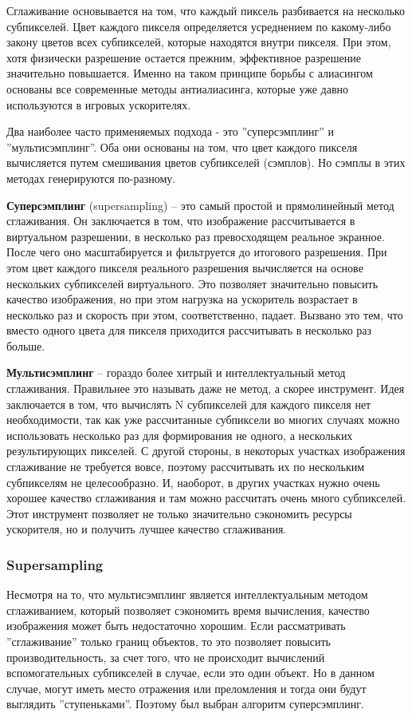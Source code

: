 \documentclass[12pt, a4paper, utf8]{article}
\begin{document}
Сглаживание основывается на том, что каждый пиксель разбивается на несколько субпикселей. Цвет каждого пикселя определяется усреднением по какому-либо закону цветов всех субпикселей, которые находятся внутри пикселя. При этом, хотя физически разрешение остается прежним, эффективное разрешение значительно повышается. Именно на таком принципе борьбы с алиасингом основаны все современные методы антиалиасинга, которые уже давно используются в игровых ускорителях.

Два наиболее часто применяемых подхода - это ''суперсэмплинг'' и ''мультисэмплинг''. Оба они основаны на том, что цвет каждого пикселя вычисляется путем смешивания цветов субпикселей (сэмплов). Но сэмплы в этих методах генерируются по-разному.

\textbf{Суперсэмплинг} (supersampling) -- это самый простой и прямолинейный метод сглаживания. Он заключается в том, что изображение рассчитывается в виртуальном разрешении, в несколько раз превосходящем реальное экранное. После чего оно масштабируется и фильтруется до итогового разрешения. При этом цвет каждого пикселя реального разрешения вычисляется на основе нескольких субпикселей виртуального. Это позволяет значительно повысить качество изображения, но при этом нагрузка на ускоритель возрастает в несколько раз и скорость при этом, соответственно, падает. Вызвано это тем, что вместо одного цвета для пикселя приходится рассчитывать в несколько раз больше.

\textbf{Мультисэмплинг} -- гораздо более хитрый и интеллектуальный метод сглаживания. Правильнее это называть даже не метод, а скорее инструмент. Идея заключается в том, что вычислять N субпикселей для каждого пикселя нет необходимости, так как уже рассчитанные субпиксели во многих случаях можно использовать несколько раз для формирования не одного, а нескольких результирующих пикселей. С другой стороны, в некоторых участках изображения сглаживание не требуется вовсе, поэтому рассчитывать их по нескольким субпикселям не целесообразно. И, наоборот, в других участках нужно очень хорошее качество сглаживания и там можно рассчитать очень много субпикселей. Этот инструмент позволяет не только значительно сэкономить ресурсы ускорителя, но и получить лучшее качество сглаживания.

\subsubsection{Supersampling}
Несмотря на то, что мультисэмплинг является интеллектуальным методом сглаживанием, который позволяет сэкономить время вычисления, качество изображения может быть недостаточно хорошим. Если рассматривать ''сглаживание'' только границ объектов,  то это позволяет повысить производительность, за счет того, что не происходит вычислений вспомогательных субпикселей в случае, если это один объект. Но в данном случае, могут иметь место отражения или преломления и тогда они будут выглядить ''ступеньками''. Поэтому был выбран алгоритм суперсэмплинг. 
\end{document}

